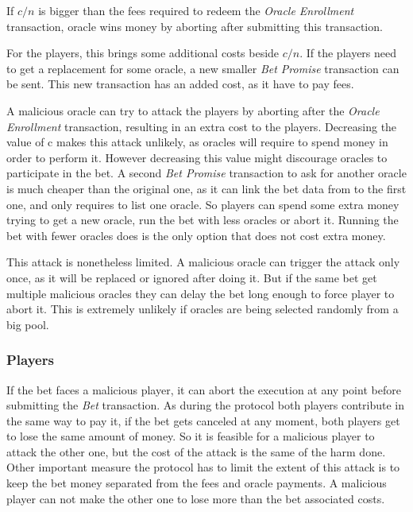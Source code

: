 If $c/n$ is bigger than the fees required to redeem the
  \textit{Oracle Enrollment} transaction, oracle wins money by aborting after
  submitting this transaction.

For the players, this brings some additional costs beside $c/n$.
If the players need to get a replacement for some oracle, a new smaller
  \textit{Bet Promise} transaction can be sent.
This new transaction has an added cost, as it have to pay fees.

A malicious oracle can try to attack the players by aborting after the
  \textit{Oracle Enrollment} transaction, resulting in an extra cost to the
  players.
Decreasing the value of c makes this attack unlikely, as oracles will require
  to spend money in order to perform it.
However decreasing this value might discourage oracles to participate in the
  bet.
A second \textit{Bet Promise} transaction to ask for another oracle is much
  cheaper than the original one, as it can link the bet data from to the first
  one, and only requires to list one oracle.
So players can spend some extra money trying to get a new oracle, run the bet
  with less oracles or abort it.
Running the bet with fewer oracles does is the only option that does not cost
  extra money.

This attack is nonetheless limited.
A malicious oracle can trigger the attack only once, as it will be replaced or
  ignored after doing it.
But if the same bet get multiple malicious oracles they can delay the bet long
  enough to force player to abort it.
This is extremely unlikely if oracles are being selected randomly from a big
  pool.

\subsubsection{Players} \label{subsec:individual_attack_player}
If the bet faces a malicious player, it can abort the execution at any point
  before submitting the \textit{Bet} transaction.
As during the protocol both players contribute in the same way to pay it, if the bet
  gets canceled at any moment, both players get to lose the same amount of
  money.
So it is feasible for a malicious player to attack the other one, but the cost
  of the attack is the same of the harm done.
Other important measure the protocol has to limit the extent of this attack
  is to keep the bet money separated from the fees and oracle payments.
A malicious player can not make the other one to lose more than the bet
  associated costs.

